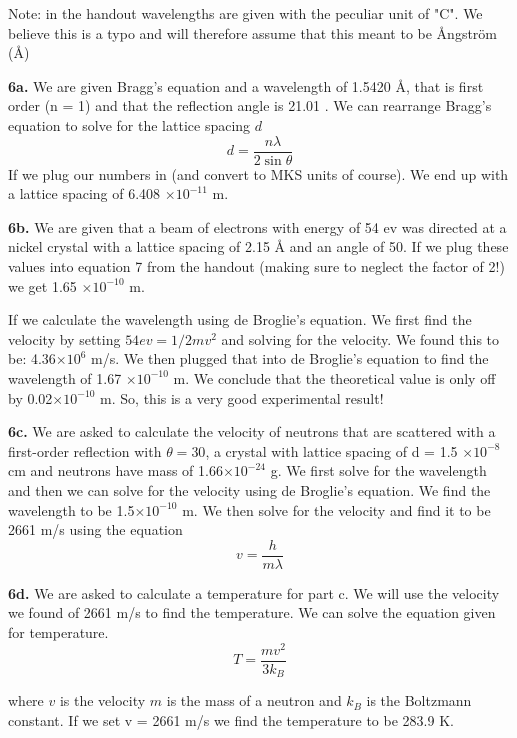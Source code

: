 \documentclass[12pt letterpaper]{article}
\providecommand{\e}[1]{\ensuremath{\times 10^{#1}}}
\begin{document}
Note: in the handout wavelengths are given with the peculiar unit of "C". We believe this is a typo and will therefore assume that this meant to be {\AA}ngstr\"{o}m ({\AA}) 
\medskip

\noindent\textbf{6a.} We are given Bragg's equation and a wavelength of 1.5420 {\AA}, that is first order (n = 1) and that the reflection angle is 21.01 \degree. We can rearrange Bragg's equation to solve for the lattice spacing $d$ 
$$ 
d = \frac{n \lambda}{2 \sin \theta}
$$
If we plug our numbers in (and convert to MKS units of course). We end up with a lattice spacing of 6.408 \e{-11} m. 

\medskip

\noindent \textbf{6b.} We are given that a beam of electrons with energy of 54 ev was directed at a nickel crystal with a lattice spacing of 2.15 {\AA} and an angle of 50\degree. If we plug these values into equation 7 from the handout (making sure to neglect the factor of 2!) we get 1.65 \e{-10} m. 

If we calculate the wavelength using de Broglie's equation. We first find the velocity by setting $54 ev = 1/2 m v ^2 $ and solving for the velocity. We found this to be: 4.36\e{6} m/s. We then plugged that into de Broglie's equation to find the wavelength of 
1.67 \e{-10} m. We conclude that the theoretical value is only off by 0.02\e{-10} m. So, this is a very good experimental result! 
\medskip 

\noindent \textbf{6c.} We are asked to calculate the velocity of neutrons that are scattered with a first-order reflection with $\theta = 30$\degree, a crystal with lattice spacing of d = 1.5 \e{-8} cm and neutrons have mass of 1.66\e{-24} g. We first solve for the wavelength and then we can solve for the velocity using de Broglie's equation. We find the wavelength to be 1.5\e{-10} m. We then solve for the velocity and find it to be 2661 m/s using the equation 
$$ 
v = \frac{h}{m \lambda}
$$

\medskip 

\noindent \textbf{6d.} We are asked to calculate a temperature for part c. We will use the velocity we found of 2661 m/s to find the temperature. We can solve the equation given for temperature. 
$$ 
T = \frac{m v^2}{3 k_B}
$$

where $v$ is the velocity $m$ is the mass of a neutron and $k_B$ is the Boltzmann constant. If we set v = 2661 m/s we find the temperature to be 283.9 K. 
\end{document}
